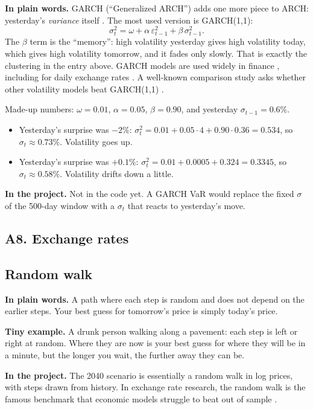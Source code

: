 \documentclass[11pt,a4paper]{article}
\newcommand{\term}[1]{\subsection{#1}}
\newcommand{\plain}{\textbf{In plain words.} }
\newcommand{\inproj}{\textbf{In the project.} }
\newcommand{\tinyex}{\textbf{Tiny example.} }
\begin{document}
\plain GARCH (``Generalized ARCH'') adds one more piece to ARCH: yesterday's
\emph{variance} itself \citep{bollerslev1986}. The most used version is
GARCH(1,1):
\[
  \sigma_t^2 = \omega + \alpha\,\varepsilon_{t-1}^2 + \beta\,\sigma_{t-1}^2 .
\]
The $\beta$ term is the ``memory'': high volatility yesterday gives high
volatility today, which gives high volatility tomorrow, and it fades only
slowly. That is exactly the clustering in the entry above. GARCH models are
used widely in finance \citep{bollerslev1992}, including for daily exchange
rates \citep{baillie1989}. A well-known comparison study asks whether other
volatility models beat GARCH(1,1) \citep{hansenlunde2005}.

\begin{example}
Made-up numbers: $\omega = 0.01$, $\alpha = 0.05$, $\beta = 0.90$, and
yesterday $\sigma_{t-1} = 0.6\%$.
\begin{itemize}
  \item Yesterday's surprise was $-2\%$:
    $\sigma_t^2 = 0.01 + 0.05\cdot 4 + 0.90 \cdot 0.36 = 0.534$,
    so $\sigma_t \approx 0.73\%$. Volatility goes up.
  \item Yesterday's surprise was $+0.1\%$:
    $\sigma_t^2 = 0.01 + 0.0005 + 0.324 = 0.3345$,
    so $\sigma_t \approx 0.58\%$. Volatility drifts down a little.
\end{itemize}
\end{example}

\inproj Not in the code yet. A GARCH VaR would replace the fixed $\sigma$ of
the 500-day window with a $\sigma_t$ that reacts to yesterday's move.

\subsection*{A8. Exchange rates}

\term{Random walk}\label{g:rw}
\plain A path where each step is random and does not depend on the earlier
steps. Your best guess for tomorrow's price is simply today's price.

\tinyex A drunk person walking along a pavement: each step is left or right
at random. Where they are now is your best guess for where they will be in
a minute, but the longer you wait, the further away they can be.

\inproj The 2040 scenario is essentially a random walk in log prices, with
steps drawn from history. In exchange rate research, the random walk is the
famous benchmark that economic models struggle to beat out of sample
\citep{meese1983,rossi2013}.
\end{document}
